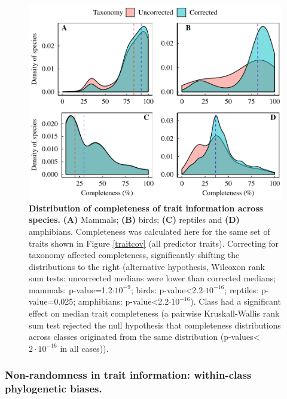 \begin{figure}[h]
\centering
\includegraphics[scale=0.70]{figures/chapter2/Trait_coverage/Missing_values/Traitcompleteness}
\caption[Distribution of completeness of trait information across species]{\textbf{Distribution of completeness of trait information across species.} \textbf{(A)} Mammals; \textbf{(B)} birds; \textbf{(C)} reptiles and \textbf{(D)} amphibians. Completeness was calculated here for the same set of traits shown in Figure \ref{traitcov} (all predictor traits). Correcting for taxonomy affected completeness, significantly shifting the distributions to the right (alternative hypothesis, Wilcoxon rank sum tests: uncorrected medians were lower than corrected medians; mammals: p-value=1.2$\cdot10^{-9}$; birds: p-value<2.2$\cdot10^{-16}$; reptiles: p-value=0.025; amphibians: p-value<2.2$\cdot10^{-16}$). Class had a significant effect on median trait completeness (a pairwise Kruskall-Wallis rank sum test rejected the null hypothesis that completeness distributions across classes originated from the same distribution (p-values<$2\cdot10^{-16}$ in all cases)).}
\label{traitcomp}
\end{figure}


\pagebreak
\subsubsection{Non-randomness in trait information: within-class phylogenetic biases.}

